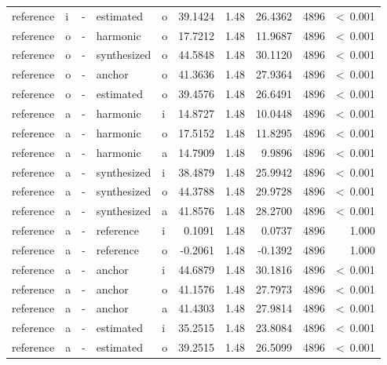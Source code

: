 \documentclass[a4paper,man,hidelinks,floatsintext]{apa7}
\begin{document}
\begin{table}[!htbp]
\begin{adjustbox}{max size={\columnwidth}{\textheight}}
\begin{tabular}{llrllrrrrr}
reference   & i     & - & estimated   & o     &    39.1424 & 1.48 &  26.4362 & 4896 &  \textless~0.001 \\
reference   & o     & - & harmonic    & o     &    17.7212 & 1.48 &  11.9687 & 4896 &  \textless~0.001 \\
reference   & o     & - & synthesized & o     &    44.5848 & 1.48 &  30.1120 & 4896 &  \textless~0.001 \\
reference   & o     & - & anchor      & o     &    41.3636 & 1.48 &  27.9364 & 4896 &  \textless~0.001 \\
reference   & o     & - & estimated   & o     &    39.4576 & 1.48 &  26.6491 & 4896 &  \textless~0.001 \\
reference   & a     & - & harmonic    & i     &    14.8727 & 1.48 &  10.0448 & 4896 &  \textless~0.001 \\
reference   & a     & - & harmonic    & o     &    17.5152 & 1.48 &  11.8295 & 4896 &  \textless~0.001 \\
reference   & a     & - & harmonic    & a     &    14.7909 & 1.48 &   9.9896 & 4896 &  \textless~0.001 \\
reference   & a     & - & synthesized & i     &    38.4879 & 1.48 &  25.9942 & 4896 &  \textless~0.001 \\
reference   & a     & - & synthesized & o     &    44.3788 & 1.48 &  29.9728 & 4896 &  \textless~0.001 \\
reference   & a     & - & synthesized & a     &    41.8576 & 1.48 &  28.2700 & 4896 &  \textless~0.001 \\
reference   & a     & - & reference   & i     &     0.1091 & 1.48 &   0.0737 & 4896 &            1.000 \\
reference   & a     & - & reference   & o     &    -0.2061 & 1.48 &  -0.1392 & 4896 &            1.000 \\
reference   & a     & - & anchor      & i     &    44.6879 & 1.48 &  30.1816 & 4896 &  \textless~0.001 \\
reference   & a     & - & anchor      & o     &    41.1576 & 1.48 &  27.7973 & 4896 &  \textless~0.001 \\
reference   & a     & - & anchor      & a     &    41.4303 & 1.48 &  27.9814 & 4896 &  \textless~0.001 \\
reference   & a     & - & estimated   & i     &    35.2515 & 1.48 &  23.8084 & 4896 &  \textless~0.001 \\
reference   & a     & - & estimated   & o     &    39.2515 & 1.48 &  26.5099 & 4896 &  \textless~0.001 \\

\end{tabular}
\end{adjustbox}
\end{table}
\end{document}
